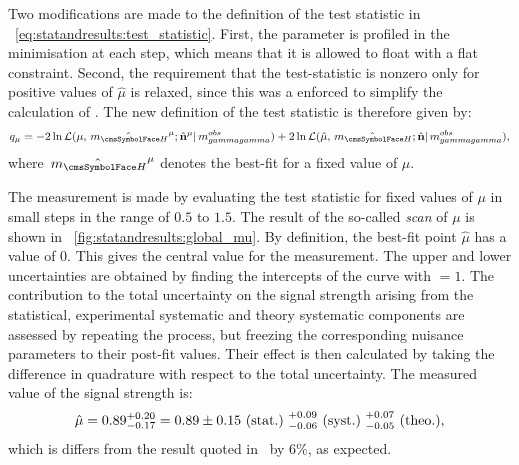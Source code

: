 Two modifications are made to the definition of the test statistic in \Eq~\ref{eq:statandresults:test_statistic}. First, the \mH parameter is profiled in the minimisation at each step, which means that it is allowed to float with a flat constraint. Second, the requirement that the test-statistic is nonzero only for positive values of $\hat{\mu}$ is relaxed, since this was a enforced to simplify the calculation of \pvalue\s. The new definition of the test statistic is therefore given by: 
\begin{equation}
\label{eq:statandresults:test_statistic_profMH}
q_{\mu} = -2 \ln \mathcal{L}(\mu,\hat{\mH}^{\mu}; \hat{\mathbf{n}}^{\mu}| \mgg^{obs})+ 2\ln\mathcal{L}(\hat{\mu},\hat{\mH};\hat{\mathbf{n}}| \mgg^{obs} ), 
\end{equation}
where $\hat{\mH}^{\mu}$ denotes the best-fit \mH for a fixed value of $\mu$. %

The measurement is made by evaluating the test statistic for fixed values of $\mu$ in small steps in the range of $0.5$ to $1.5$. The result of the so-called \DNLL \emph{scan} of $\mu$ is shown in \Fig~\ref{fig:statandresults:global_mu}. By definition, the best-fit point $\hat{\mu}$ has a \DNLL value of $0$. This gives the central value for the measurement. The upper and lower uncertainties are obtained by finding the intercepts of the curve with \DNLL$=1$. 
The contribution to the total uncertainty on the signal strength arising from the statistical, experimental systematic and theory systematic components are assessed by repeating the process, but freezing the corresponding nuisance parameters to their post-fit values. Their effect is then calculated by taking the difference in quadrature with respect to the total uncertainty. 
The measured value of the signal strength is:
\begin{equation*}
\hat{\mu} = 0.89^{+0.20}_{-0.17} = 0.89 \pm 0.15 \text{~(stat.)~} ^{+0.09}_{-0.06} \text{~(syst.)~} ^{+0.07}_{-0.05} \text{~(theo.)},
\end{equation*}
which is differs from the result quoted in~\cite{CMS-PAS-HIG-16-020} by 6\%, as expected. 

